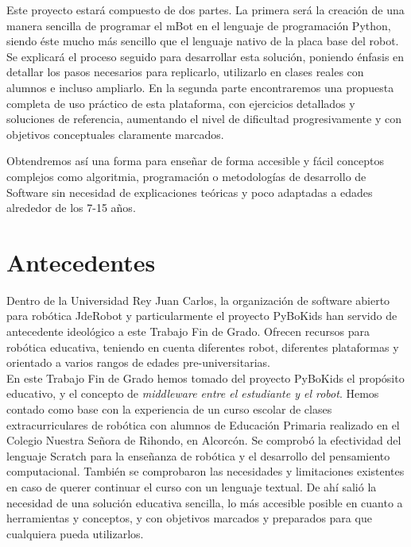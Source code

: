 Este proyecto estará compuesto de dos partes. La primera será la creación de una manera sencilla de programar el mBot en el lenguaje de programación Python, siendo éste mucho más sencillo que el lenguaje nativo de la placa base del robot. Se explicará el proceso seguido para desarrollar esta solución, poniendo énfasis en detallar los pasos necesarios para replicarlo, utilizarlo en clases reales con alumnos e incluso ampliarlo. En la segunda parte encontraremos una propuesta completa de uso práctico de esta plataforma, con ejercicios detallados y soluciones de referencia, aumentando el nivel de dificultad progresivamente y con objetivos conceptuales claramente marcados.

Obtendremos así una forma para enseñar de forma accesible y fácil conceptos complejos como algoritmia, programación o metodologías de desarrollo de Software sin necesidad de explicaciones teóricas y poco adaptadas a edades alrededor de los 7-15 años.


\section{Antecedentes}\label{sec:antecedentes}

Dentro de la Universidad Rey Juan Carlos, la organización de software abierto para robótica JdeRobot y particularmente el proyecto PyBoKids \cite{JdeRobot} han servido de antecedente ideológico a este Trabajo Fin de Grado. Ofrecen recursos para robótica educativa, teniendo en cuenta diferentes robot, diferentes plataformas y orientado a varios rangos de edades pre-universitarias.\\

En este Trabajo Fin de Grado hemos tomado del proyecto PyBoKids el propósito educativo, y el concepto de \textit{middleware entre el estudiante y el robot}. Hemos contado como base con la experiencia de un curso escolar de clases extracurriculares de robótica con alumnos de Educación Primaria realizado en el Colegio Nuestra Señora de Rihondo, en Alcorcón. Se comprobó la efectividad del lenguaje Scratch para la enseñanza de robótica y el desarrollo del pensamiento computacional. También se comprobaron las necesidades y limitaciones existentes en caso de querer continuar el curso con un lenguaje textual. De ahí salió la necesidad de una solución educativa sencilla, lo más accesible posible en cuanto a herramientas y conceptos, y con objetivos marcados y preparados para que cualquiera pueda utilizarlos.



